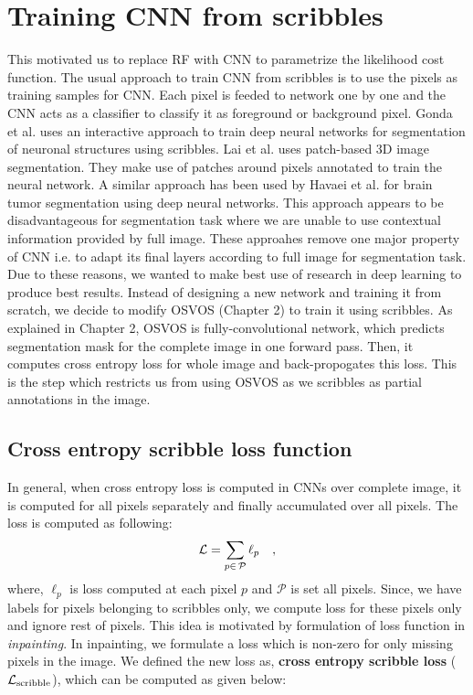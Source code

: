 \section{Training CNN from scribbles}
This motivated us to replace RF with CNN to parametrize the likelihood cost function. The usual approach to train CNN from scribbles is to use the pixels as training samples for CNN. Each pixel is feeded to network one by one and the CNN acts as a classifier to classify it as foreground or background pixel. Gonda et al.\cite{Gonda:2016} uses an interactive approach to train deep neural networks for segmentation of neuronal structures using scribbles. Lai et al. \cite{Lai:2015} uses patch-based 3D image segmentation. They make use of patches around pixels annotated to train the neural network. A similar approach has been used by Havaei et al.\cite{Havaei:2015} for brain tumor segmentation using deep neural networks. This approach appears to be disadvantageous for segmentation task where we are unable to use contextual information provided by full image. These approahes remove one major property of CNN i.e. to adapt its final layers according to full image for segmentation task. Due to these reasons, we wanted to make best use of research in deep learning to produce best results. Instead of designing a new network and training it from scratch, we decide to modify OSVOS (Chapter 2) to train it using scribbles. As explained in Chapter 2, OSVOS is fully-convolutional network, which predicts segmentation mask for the complete image in one forward pass. Then, it computes cross entropy loss for whole image and back-propogates this loss. This is the step which restricts us from using OSVOS as we scribbles as partial annotations in the image.

\subsection{Cross entropy scribble loss function}
In general, when cross entropy loss is computed in CNNs over complete image, it is computed for all pixels separately and finally accumulated over all pixels. The loss is computed as following:
\begin{equation*}\label{eq:nll_gen}
\mathcal{L} = \sum_{p\in\,\mathcal{P}}{\ell_{p}} \quad ,
\end{equation*}
where, $\ell_{p}$ is loss computed at each pixel $p$ and $\mathcal{P}$ is set all pixels.
Since, we have labels for pixels belonging to scribbles only, we compute loss for these pixels only and ignore rest of pixels. This idea is motivated by formulation of loss function in \textit{inpainting}. In inpainting, we formulate a loss which is non-zero for only missing pixels in the image. We defined the new loss as, \textbf{cross entropy scribble loss} ($\mathcal{L}_{\rm{scribble}}$), which can be computed as given below:


